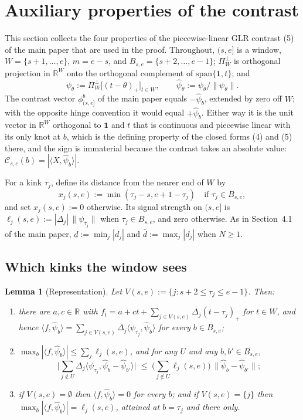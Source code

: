 \documentclass[12pt, a4paper]{article}
\newtheorem{lemma}{Lemma}[section]
\begin{document}
\section{Auxiliary properties of the contrast}
\label{sup:toolkit}

This section collects the four properties of the piecewise-linear GLR contrast (5) of the main paper that are used in the proof. Throughout, $(s,e]$ is a window, $W = \{s+1,\ldots,e\}$,
$m = e-s$, and $B_{s,e} = \{s+2,\ldots,e-1\}$; $\Pi^\perp_W$ is orthogonal
projection in $\mathbb{R}^W$ onto the orthogonal complement of
$\mathrm{span}\{\mathbf 1, t\}$; and
\[
\psi_\theta := \Pi^\perp_W\big[(t-\theta)_+\big]_{t \in W},
\qquad
\hat\psi_\theta := \psi_\theta / \|\psi_\theta\| .
\]
The contrast vector $\phi^b_{(s,e]}$ of the main paper equals $-\hat\psi_b$, extended by zero off $W$; with the opposite hinge convention it would equal $+\hat\psi_b$. Either way it is the unit vector in $\mathbb{R}^W$ orthogonal to $\mathbf 1$ and $t$ that is continuous and piecewise linear with its only knot at $b$, which is the defining property of the closed forms (4) and (5) there, and the sign is immaterial because the contrast takes an absolute value: $\mathcal{C}_{s,e}(b) = |\langle X, \hat\psi_b\rangle|$.

For a kink $\tau_j$, define its distance from the nearer end of $W$ by
\[
x_j(s,e):=\min(\tau_j-s,e+1-\tau_j)
\quad\text{if }\tau_j\in B_{s,e},
\]
and set $x_j(s,e):=0$ otherwise. Its signal strength on $(s,e]$ is
$\ell_j(s,e):=|\Delta_j|\,\|\psi_{\tau_j}\|$ when
$\tau_j\in B_{s,e}$, and zero otherwise. As in Section~4.1 of the main paper,
$\underline d:=\min_j|d_j|$ and $\bar d:=\max_j|d_j|$ when $N\ge1$.

\subsection{Which kinks the window sees}

\begin{lemma}[Representation]
\label{lem:rep}
Let $V(s,e) := \{ j : s+2 \le \tau_j \le e-1 \}$. Then:
\begin{enumerate}
\item[\emph{(a)}] there are $a,c \in \mathbb{R}$ with
$f_t = a + ct + \sum_{j \in V(s,e)} \Delta_j (t-\tau_j)_+$ for $t \in W$, and
hence
$\langle f, \hat\psi_b\rangle = \sum_{j \in V(s,e)} \Delta_j \langle
\psi_{\tau_j}, \hat\psi_b\rangle$ for every $b \in B_{s,e}$;
\item[\emph{(b)}] $\max_{b} |\langle f, \hat\psi_b\rangle| \le \sum_j
\ell_j(s,e)$, and for any $U$ and any $b, b' \in B_{s,e}$,
\[
\Big| \sum_{j \notin U} \Delta_j \langle \psi_{\tau_j},
\hat\psi_b - \hat\psi_{b'} \rangle \Big|
\;\le\; \Big( \sum_{j \notin U} \ell_j(s,e) \Big)\,
\|\hat\psi_b - \hat\psi_{b'}\| ;
\]
\item[\emph{(c)}] if $V(s,e) = \emptyset$ then $\langle f,\hat\psi_b\rangle = 0$
for every $b$; and if $V(s,e) = \{j\}$ then
$\max_b |\langle f,\hat\psi_b\rangle| = \ell_j(s,e)$, attained at $b = \tau_j$
and there only.
\end{enumerate}
\end{lemma}
\end{document}
